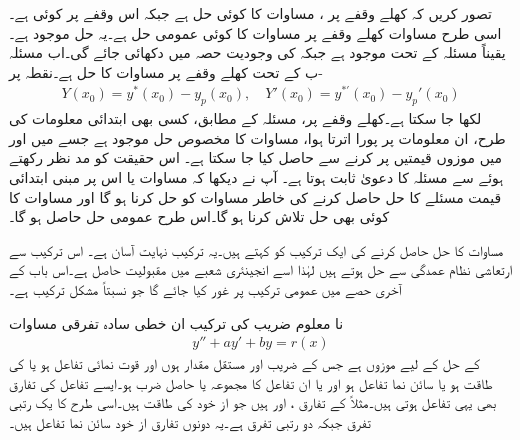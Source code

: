 تصور کریں کہ کھلے وقفے  پر ،  مساوات  کا کوئی حل ہے جبکہ  اس وقفے پر کوئی  ہے۔اسی طرح مساوات  کھلے وقفے پر مساوات  کا کوئی عمومی حل ہے۔یہ حل موجود ہے۔یقیناً  مسئلہ  کے تحت موجود ہے جبکہ  کی وجودیت حصہ  میں  دکھائی جائے گی۔اب مسئلہ -ب کے تحت   کھلے وقفے پر مساوات  کا حل ہے۔نقطہ  پر
\begin{align*}
Y(x_0)=y^*(x_0)-y_p(x_0), \quad Y'(x_0)=y^{*'}(x_0)-y_p'(x_0)
\end{align*}
لکھا جا سکتا ہے۔کھلے وقفے   پر، مسئلہ  کے مطابق، کسی بھی ابتدائی معلومات کی طرح، ان معلومات پر پورا اترتا ہوا، مساوات  کا مخصوص حل موجود ہے جسے  میں  اور  میں موزوں  قیمتیں پر کرنے سے حاصل کیا جا سکتا ہے۔  اس حقیقت کو مد نظر رکھتے ہوئے   سے مسئلہ کا دعویٰ ثابت ہوتا ہے۔
آپ نے دیکھا کہ مساوات  یا اس پر مبنی ابتدائی قیمت مسئلے کا حل  حاصل کرنے کی خاطر مساوات  کو حل کرنا ہو گا اور مساوات  کا کوئی بھی حل   تلاش کرنا ہو گا۔اس طرح عمومی حل  حاصل ہو گا۔

مساوات  کا حل  حاصل کرنے کی ایک ترکیب کو   کہتے ہیں۔یہ ترکیب نہایت آسان ہے۔ اس ترکیب سے ارتعاشی نظام عمدگی سے حل ہوتے ہیں لہٰذا اسے انجینئری شعبے میں مقبولیت حاصل ہے۔اس باب کے آخری حصے میں عمومی ترکیب پر غور کیا جائے گا جو نسبتاً مشکل ترکیب ہے۔

نا معلوم  ضریب  کی ترکیب ان خطی سادہ تفرقی مساوات
\begin{align}\label{مساوات_سادہ_دو_نا_معلوم_الف}
y''+ay'+by=r(x)
\end{align}
 کے حل کے لیے موزوں ہے جس کے  ضریب   اور  مستقل مقدار ہوں اور  قوت نمائی تفاعل ہو یا  کی طاقت ہو یا  سائن نما تفاعل ہو اور یا ان تفاعل کا مجموعہ یا حاصل ضرب ہو۔ایسے تفاعل کی تفارق بھی یہی تفاعل ہوتی ہیں۔مثلاً  کے تفارق   ،  اور  ہیں جو از خود  کی طاقت ہیں۔اسی طرح  کا یک رتبی تفرق  جبکہ دو رتبی تفرق  ہے۔یہ دونوں تفارق از خود  سائن نما تفاعل ہیں۔

